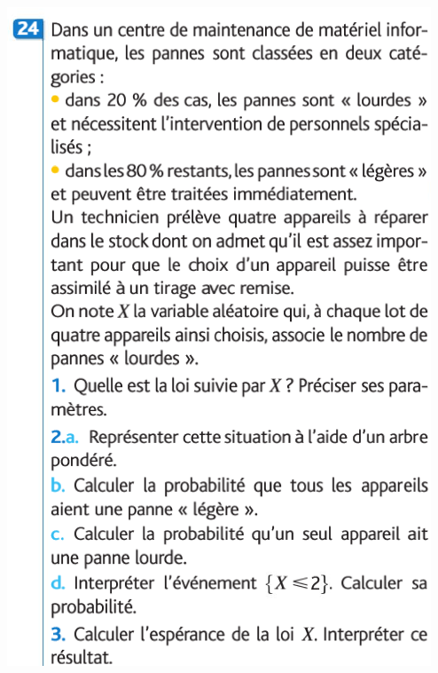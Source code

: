 \documentclass{article}
\begin{document}
\begin{center}
\includegraphics[width=\textwidth]{Exercices_2.png}
\end{center}
\end{document}
